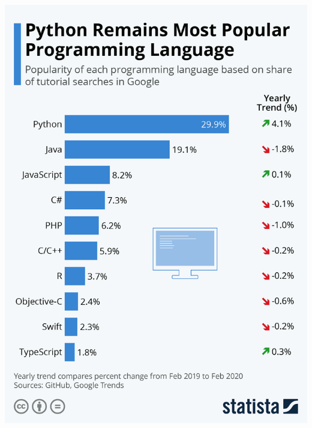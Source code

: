 \begin{frame}

 \begin{center}
    \includegraphics[scale=0.13]{img/most_popular.jpeg}
 \end{center}

\end{frame}

